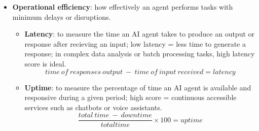 \documentclass[12pt, letterpaper]{article}
\begin{document}
\begin{itemize}
\begin{itemize}
\begin{itemize}
                        \begin{equation}
                            (\frac{number \ of \ correct \ prediction}{total \ number \ of \ predictions}) \times 100 = accuracy
                        \end{equation}
                    \item \textbf{Precision}: to measure the quality of an AI agent's positive predictions; how many of the items an agent identifies as having a certain feature or meeting a certain condition are actually correct; positives = detected something true.
                        \begin{equation}
                            \frac{true\ positives}{(true\ positives + false\ positives)} = precision
                        \end{equation}
                    \item \textbf{Recall}: to measure an AI agent's ability to identify all positive cases correctly; helps detect how many of the total positives the agents successfully identifies as actual.
                        \begin{equation}
                            \frac{true\ positives}{(true\ positives + false\ positives)} = recall
                        \end{equation}
                \end{itemize}
            \item \textbf{Operational efficiency}: how effectively an agent performs tasks with minimum delays or disruptions.
                \begin{itemize}
                    \item \textbf{Latency}: to measure the time an AI agent takes to produce an output or response after recieving an input; low latency = less time to generate a response; in complex data analysis or batch processing tasks, high latency score is ideal.
                        \begin{equation}
                            time\ of\ responses\ output\ -\ time\ of\ input\ received = latency
                        \end{equation}
                    \item \textbf{Uptime}: to measure the percentage of time an AI agent is available and responsive during a given period; high score = continuous accessible services such as chatbots or voice assistants.
                        \begin{equation}
                            \frac{total\ time\ -\ downtime}{total time} \times 100 = uptime

\end{equation}
\end{itemize}
\end{itemize}
\end{itemize}
\end{document}
